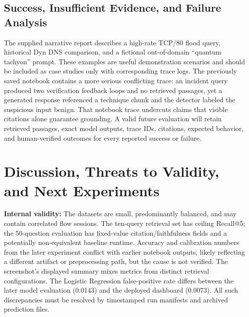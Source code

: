 \documentclass[journal,twoside]{IEEEtran}
\begin{document}
\subsection{Success, Insufficient Evidence, and Failure Analysis}
The supplied narrative report describes a high-rate TCP/80 flood query, historical Dyn DNS comparison, and a fictional out-of-domain ``quantum tachyon'' prompt. These examples are useful demonstration scenarios and should be included as case studies only with corresponding trace logs. The previously saved notebook contains a more serious conflicting trace: an incident query produced two verification feedback loops and no retrieved passages, yet a generated response referenced a technique chunk and the detector labeled the suspicious input benign. That notebook trace undercuts claims that visible citations alone guarantee grounding. A valid future evaluation will retain retrieved passages, exact model outputs, trace IDs, citations, expected behavior, and human-verified outcomes for every reported success or failure.

\section{Discussion, Threats to Validity, and Next Experiments}
\textbf{Internal validity:} The datasets are small, predominantly balanced, and may contain correlated flow sessions. The ten-query retrieval set has ceiling Recall@5; the 50-question evaluation has fixed-value citation/faithfulness fields and a potentially non-equivalent baseline runtime. Accuracy and calibration numbers from the later experiment conflict with earlier notebook outputs, likely reflecting a different artifact or preprocessing path, but the cause is not verified. The screenshot's displayed summary mixes metrics from distinct retrieval configurations. The Logistic Regression false-positive rate differs between the later model evaluation (0.0143) and the deployed dashboard (0.0073). All such discrepancies must be resolved by timestamped run manifests and archived prediction files.
\end{document}
